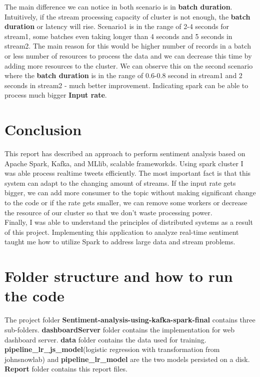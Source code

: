 \documentclass[12pt,a4paper]{report}
\begin{document}
The main difference we can notice in both scenario is in \textbf{batch duration}. Intuitively, if the stream processing capacity of cluster is not enough, the \textbf{batch duration} or latency will rise. Scenario1 is in the range of 2-4 seconds for stream1, some batches even taking longer than 4 seconds and 5 seconds in stream2. The main reason for this would be higher number of records in a batch or less number of resources to process the data and we can decrease this time by adding more resources to the cluster. We can observe this on the second scenario where the \textbf{batch duration} is in the range of 0.6-0.8 second in stream1 and 2 seconds in stream2 - much better improvement. Indicating spark can be able to process much bigger \textbf{Input rate}.

\section{Conclusion}
This report has described an approach to perform sentiment analysis based on Apache Spark, Kafka, and MLlib, scalable frameworkds. Using spark cluster I was able process realtime tweets efficiently. The most important fact is that this system can adapt to the changing amount of streams. If the input rate gets bigger, we can add more consumer to the topic without making significant change to the code or if the rate gets smaller, we can remove some workers or decrease the resource of our cluster so that we don't waste processing power. \\

Finally, I was able to understand the principles of distributed systems as a result of this project. Implementing this application to analyze real-time sentiment taught me how to utilize Spark to address large data and stream problems.


\section{Folder structure and how to run the code}
The project folder \textbf{Sentiment-analysis-using-kafka-spark-final} contains three sub-folders. \textbf{dashboardServer} folder contains the implementation for web dashboard server. \textbf{data} folder contains the data used for training. \textbf{pipeline\_lr\_js\_model}(logistic regression with transformation from johnsnowlab) and \textbf{pipeline\_lr\_model} are the two models persisted on a disk. \textbf{Report} folder contains this report files.\\
\end{document}
